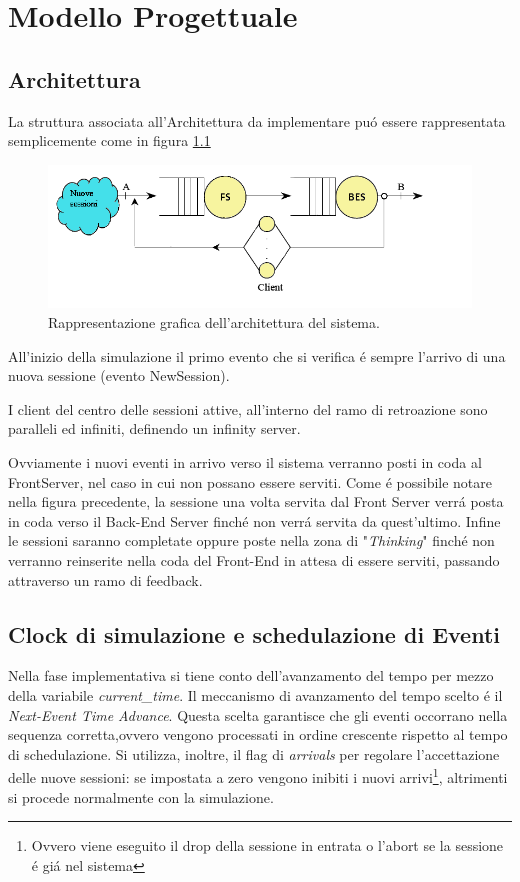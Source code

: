 \chapter{Modello Progettuale}
	\label{cap:modelloprogettuale}

\section{Architettura}
La struttura associata all'Architettura da implementare pu\'o essere rappresentata semplicemente come in figura \ref{fig:architettura}
\begin{figure}[H]
	\centering
	\includegraphics[scale=0.7]{img/architettura.png}
	\caption[Architettura del sistema]{Rappresentazione grafica dell'architettura del sistema.}
	\label{fig:architettura}
	\end{figure}
All'inizio della simulazione il primo evento che si verifica \'e sempre l'arrivo di una nuova sessione (evento NewSession).

\vspace{0.5cm}I client del centro delle sessioni attive, all'interno del ramo di retroazione sono paralleli ed infiniti, definendo un infinity server.

\vspace{0.5cm}Ovviamente i nuovi eventi in arrivo verso il sistema verranno posti in coda al FrontServer, nel caso in cui non possano essere serviti. Come \'e possibile notare nella figura precedente, la sessione una volta servita dal Front Server verr\'a posta in coda verso il Back-End Server finch\'e non verr\'a servita da quest'ultimo. Infine le sessioni saranno completate oppure poste nella zona di "\textit{Thinking}" finch\'e non verranno reinserite nella coda del Front-End in attesa di essere serviti, passando attraverso un ramo di feedback.
 
\section{Clock di simulazione e schedulazione di  Eventi}
Nella fase implementativa si tiene conto dell'avanzamento del tempo per mezzo della variabile \textit{current\_time}. Il meccanismo di avanzamento del tempo scelto \'e il \textit{Next-Event Time Advance}. Questa scelta garantisce che gli eventi occorrano nella sequenza corretta,ovvero vengono processati in ordine crescente rispetto al tempo di schedulazione. Si utilizza, inoltre, il flag di \textit{arrivals} per regolare l'accettazione delle nuove sessioni: se impostata a zero vengono inibiti i nuovi arrivi\footnote{Ovvero viene eseguito il drop della sessione in entrata o l'abort se la sessione \'e gi\'a nel sistema}, altrimenti si procede normalmente con la simulazione.


